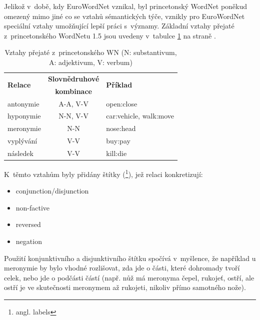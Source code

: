 \documentclass[a4paper,11pt,openany,twoside]{book}
\newcommand\ex{\textsf}
\begin{document}
				Jelikož v~době, kdy EuroWordNet vznikal, byl princetonský WordNet poněkud omezený mimo jiné co se vztahů sémantických týče, vznikly pro EuroWordNet speciální vztahy umožňující lepší práci s~významy. Základní vztahy přejaté z~princetonského WordNetu 1.5 jsou uvedeny v~tabulce \ref{tab:wn-rels} na straně \pageref{tab:wn-rels}.

				\begin{table}[t]
					\centering
					\label{tab:wn-rels}
					\begin{tabular}{l c l}
					\multirow{ 2}{*}{\textbf{Relace}}       & \textbf{Slovnědruhové} & \multirow{ 2}{*}{\textbf{Příklad}}        \\
					                               & \textbf{kombinace}     &                                  \\ \hline
					antonymie                      & A-A, V-V      & \ex{open:close}                  \\ \hline
					hyponymie                      & N-N, V-V      & \ex{car:vehicle}, \ex{walk:move} \\ \hline
					meronymie                      & N-N           & \ex{nose:head}                   \\ \hline
					vyplývání\protect\footnotemark & V-V           & \ex{buy:pay}                     \\ \hline
					následek                       & V-V           & \ex{kill:die}               
					\end{tabular}
					\caption{Vztahy přejaté z~princetonského WN (N: substantivum, A: adjektivum, V: verbum)}
				\end{table}


				K~těmto vztahům byly přidány štítky (\footnote{angl. labels}), jež relaci konkretizují:

				\begin{itemize}
					\item conjunction/disjunction
					\item non-factive
					\item reversed
					\item negation
				\end{itemize}

				Použití konjunktivního a disjunktivního štítku spočívá v~myšlence, že například u meronymie by bylo vhodné rozlišovat, zda jde o části, které dohromady tvoří celek, nebo jde o podčásti částí (např. \ex{nůž} má meronyma \ex{čepel}, \ex{rukojeť}, \ex{ostří}, ale \ex{ostří} je ve skutečnosti meronymem až \ex{rukojeti}, nikoliv přímo samotného \ex{nože}).
\end{document}
